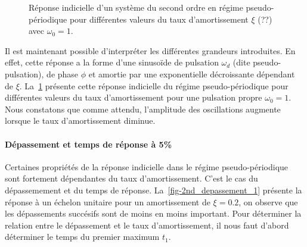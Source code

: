 \begin{figure}[!t]
\begin{center}
\caption{Réponse indicielle d'un système du second ordre en régime pseudo-périodique pour 
différentes valeurs du taux d'amortissement $\xi$  (??) avec $\omega_0=1$. \label{fig-2nd_pp}}
\end{center}
\end{figure}

Il est maintenant possible d'interpréter les différentes grandeurs introduites. En effet,
cette réponse a la forme d'une sinuso\"ide de pulsation $\omega_d$
(dite pseudo-pulsation), de phase $\phi$ et amortie par une exponentielle décroissante dépendant de $\xi$.
La~\cref{fig-2nd_pp} présente cette réponse indicielle du régime pseudo-périodique pour différentes valeurs du 
taux d'amortissement pour une pulsation propre $\omega_0=1$.
Nous constatons que comme attendu, l'amplitude des oscillations augmente lorsque le taux d'amortissement diminue.

\newpage
\paragraph{Dépassement et temps de réponse à 5\%}
Certaines propriétés de la réponse indicielle dans le régime pseudo-périodique sont fortement 
dépendantes du taux d'amortissement. C'est le cas du dépassemement et du temps de réponse. 
La~\cref{fig-2nd_depassement_1} présente la réponse à un échelon unitaire pour un amortissement de $\xi=0.2$, 
on observe que les dépassements succésifs sont de moins en moins important. Pour déterminer la relation entre
le dépassement et le taux d'amortissement, il nous faut d'abord déterminer le temps du premier maximum $t_1$.

